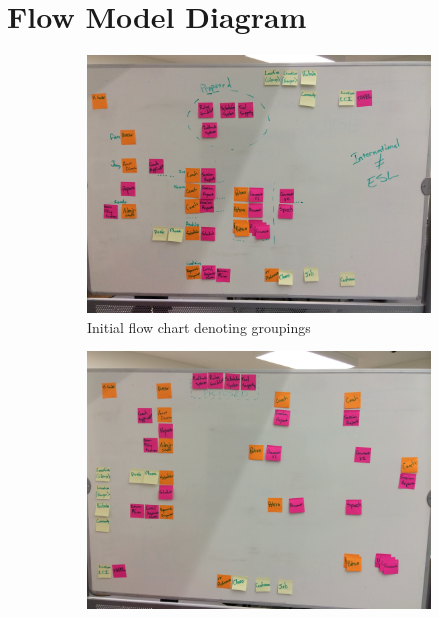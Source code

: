 \documentclass[12pt]{article} %
\begin{document}
\section{Flow Model Diagram} %
  \begin{figure}[H]
    \begin{subfigure}{.5\linewidth}
      \centering
      \includegraphics[width=0.95\linewidth]{flow/flowchart_initial}
      \caption{Initial flow chart denoting groupings}
      \label{fig:flowchart_initial}
    \end{subfigure}%
    \begin{subfigure}{.5\linewidth}
      \centering
      \includegraphics[width=0.95\linewidth]{flow/flowchart_without_arrows}

\end{subfigure}
\end{figure}
\end{document}
